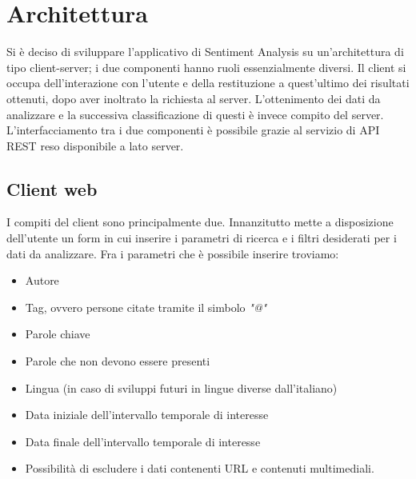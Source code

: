 \section{Architettura}

Si è deciso di sviluppare l'applicativo di Sentiment Analysis su un'architettura di tipo client-server; i due componenti hanno ruoli essenzialmente diversi. 
Il client si occupa dell'interazione con l'utente e della restituzione a quest'ultimo dei risultati ottenuti, dopo aver inoltrato la richiesta al server. L'ottenimento dei dati da analizzare e la successiva classificazione di questi è invece compito del server. L'interfacciamento tra i due componenti è possibile grazie al servizio di API REST reso disponibile a lato server. 

\subsection{Client web}
I compiti del client sono principalmente due. Innanzitutto mette a disposizione dell'utente un form in cui inserire i parametri di ricerca e i filtri desiderati per i dati da analizzare. Fra i parametri che è possibile inserire troviamo:
\begin{itemize}
    \item Autore 
    \item Tag, ovvero persone citate tramite il simbolo \textit{"@"}
    \item Parole chiave
    \item Parole che non devono essere presenti
    \item Lingua (in caso di sviluppi futuri in lingue diverse dall'italiano)
    \item Data iniziale dell'intervallo temporale di interesse
    \item Data finale dell'intervallo temporale di interesse 
    \item Possibilità di escludere i dati contenenti URL e contenuti multimediali.
\end{itemize}


